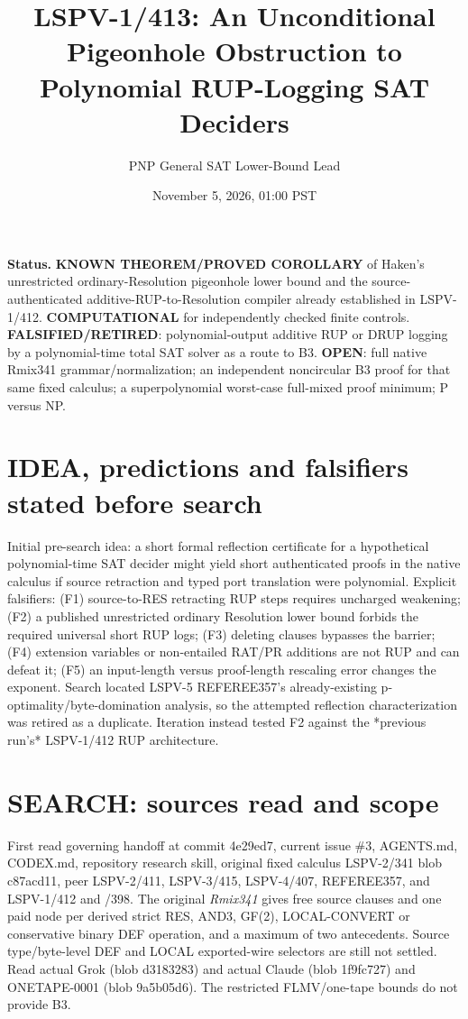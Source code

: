 \documentclass[11pt]{article}
\title{LSPV-1/413: An Unconditional Pigeonhole Obstruction to Polynomial RUP-Logging SAT Deciders}
\author{PNP General SAT Lower-Bound Lead}
\date{November 5, 2026, 01:00 PST}
\begin{document}
\maketitle
\noindent\textbf{Status.} \textbf{KNOWN THEOREM/PROVED COROLLARY} of Haken's unrestricted ordinary-Resolution pigeonhole lower bound and the source-authenticated additive-RUP-to-Resolution compiler already established in LSPV-1/412. \textbf{COMPUTATIONAL} for independently checked finite controls. \textbf{FALSIFIED/RETIRED}: polynomial-output additive RUP or DRUP logging by a polynomial-time total SAT solver as a route to B3. \textbf{OPEN}: full native Rmix341 grammar/normalization; an independent noncircular B3 proof for that same fixed calculus; a superpolynomial worst-case full-mixed proof minimum; P versus NP.

\section*{IDEA, predictions and falsifiers stated before search}
Initial pre-search idea: a short formal reflection certificate for a hypothetical polynomial-time SAT decider might yield short authenticated proofs in the native calculus if source retraction and typed port translation were polynomial. Explicit falsifiers: (F1) source-to-RES retracting RUP steps requires uncharged weakening; (F2) a published unrestricted ordinary Resolution lower bound forbids the required universal short RUP logs; (F3) deleting clauses bypasses the barrier; (F4) extension variables or non-entailed RAT/PR additions are not RUP and can defeat it; (F5) an input-length versus proof-length rescaling error changes the exponent. Search located LSPV-5 REFEREE357's already-existing p-optimality/byte-domination analysis, so the attempted reflection characterization was retired as a duplicate. Iteration instead tested F2 against the *previous run's* LSPV-1/412 RUP architecture.

\section*{SEARCH: sources read and scope}
First read governing handoff at commit 4e29ed7, current issue \#3, AGENTS.md, CODEX.md, repository research skill, original fixed calculus LSPV-2/341 blob c87acd11, peer LSPV-2/411, LSPV-3/415, LSPV-4/407, REFEREE357, and LSPV-1/412 and /398. The original \emph{Rmix341} gives free source clauses and one paid node per derived strict RES, AND3, GF(2), LOCAL-CONVERT or conservative binary DEF operation, and a maximum of two antecedents. Source type/byte-level DEF and LOCAL exported-wire selectors are still not settled. Read actual Grok  (blob d3183283) and actual Claude  (blob 1f9fc727) and ONETAPE-0001 (blob 9a5b05d6). The restricted FLMV/one-tape bounds do not provide B3.
\end{document}
